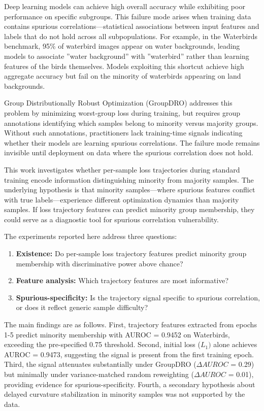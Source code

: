 
Deep learning models can achieve high overall accuracy while exhibiting poor performance on specific subgroups. This failure mode arises when training data contains spurious correlations---statistical associations between input features and labels that do not hold across all subpopulations. For example, in the Waterbirds benchmark, 95\% of waterbird images appear on water backgrounds, leading models to associate ''water background'' with ''waterbird'' rather than learning features of the birds themselves. Models exploiting this shortcut achieve high aggregate accuracy but fail on the minority of waterbirds appearing on land backgrounds.

Group Distributionally Robust Optimization (GroupDRO) addresses this problem by minimizing worst-group loss during training, but requires group annotations identifying which samples belong to minority versus majority groups. Without such annotations, practitioners lack training-time signals indicating whether their models are learning spurious correlations. The failure mode remains invisible until deployment on data where the spurious correlation does not hold.

This work investigates whether per-sample loss trajectories during standard training encode information distinguishing minority from majority samples. The underlying hypothesis is that minority samples---where spurious features conflict with true labels---experience different optimization dynamics than majority samples. If loss trajectory features can predict minority group membership, they could serve as a diagnostic tool for spurious correlation vulnerability.

The experiments reported here address three questions:

\begin{enumerate}
\item \textbf{Existence:} Do per-sample loss trajectory features predict minority group membership with discriminative power above chance?
\item \textbf{Feature analysis:} Which trajectory features are most informative?
\item \textbf{Spurious-specificity:} Is the trajectory signal specific to spurious correlation, or does it reflect generic sample difficulty?
\end{enumerate}

The main findings are as follows. First, trajectory features extracted from epochs 1-5 predict minority membership with AUROC = 0.9452 on Waterbirds, exceeding the pre-specified 0.75 threshold. Second, initial loss ($L_{1})$ alone achieves AUROC = 0.9473, suggesting the signal is present from the first training epoch. Third, the signal attenuates substantially under GroupDRO ($\Delta AUROC$ = 0.29) but minimally under variance-matched random reweighting ($\Delta AUROC$ = 0.01), providing evidence for spurious-specificity. Fourth, a secondary hypothesis about delayed curvature stabilization in minority samples was not supported by the data.
